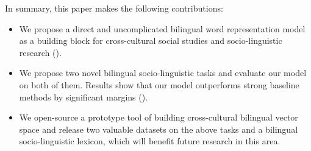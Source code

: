 

 

%

In summary, this paper makes the following contributions:
\begin{itemize}
\item We propose a direct and uncomplicated bilingual word representation model as a building block
for cross-cultural social studies and socio-linguistic research ().
\item We propose two novel bilingual socio-linguistic tasks and evaluate our model on both of them. Results
show that our model outperforms strong baseline methods by significant margins
(). 
\item We open-source a prototype tool of building cross-cultural bilingual 
vector space and release two valuable datasets on the above tasks and 
a bilingual socio-linguistic lexicon, which will benefit future research 
in this area. 
\end{itemize}
